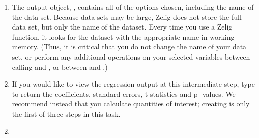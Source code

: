\documentclass[letterpaper,10pt,english]{sphinxmanual}
\begin{document}
\begin{enumerate}
\item {} 
The output object, , contains all of the options chosen, including the name of
the data set. Because data sets may be large, Zelig does not store the full data set,
but only the name of the dataset. Every time you use a Zelig function, it looks for
the dataset with the appropriate name in working memory. (Thus, it is critical
that you do not change the name of your data set, or perform any additional
operations on your selected variables between calling  and , or
between  and .)

\item {} 
If you would like to view the regression output at this intermediate step, type
 to return the coefficients, standard errors, t-statistics and p-
values. We recommend instead that you calculate quantities of interest; creating
 is only the first of three steps in this task.

\end{enumerate}
\begin{enumerate}
\setcounter{enumi}{1}
\item {} 

\end{enumerate}
\end{document}
